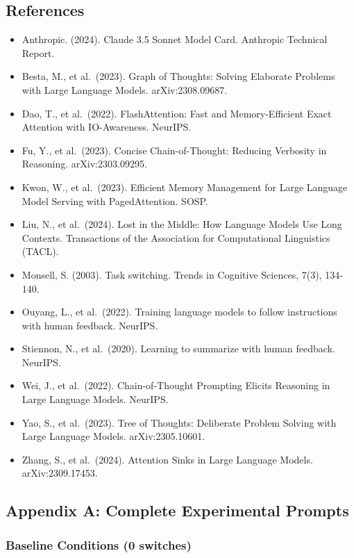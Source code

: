 \documentclass[
  11pt]{article}
\providecommand{\tightlist}{%
  \setlength{\itemsep}{0pt}\setlength{\parskip}{0pt}}
\begin{document}
\subsection{References}\label{references}

\begin{itemize}
\tightlist
\item
  Anthropic. (2024). Claude 3.5 Sonnet Model Card. Anthropic Technical
  Report.
\item
  Besta, M., et al.~(2023). Graph of Thoughts: Solving Elaborate
  Problems with Large Language Models. arXiv:2308.09687.
\item
  Dao, T., et al.~(2022). FlashAttention: Fast and Memory-Efficient
  Exact Attention with IO-Awareness. NeurIPS.
\item
  Fu, Y., et al.~(2023). Concise Chain-of-Thought: Reducing Verbosity in
  Reasoning. arXiv:2303.09295.
\item
  Kwon, W., et al.~(2023). Efficient Memory Management for Large
  Language Model Serving with PagedAttention. SOSP.
\item
  Liu, N., et al.~(2024). Lost in the Middle: How Language Models Use
  Long Contexts. Transactions of the Association for Computational
  Linguistics (TACL).
\item
  Monsell, S. (2003). Task switching. Trends in Cognitive Sciences,
  7(3), 134-140.
\item
  Ouyang, L., et al.~(2022). Training language models to follow
  instructions with human feedback. NeurIPS.
\item
  Stiennon, N., et al.~(2020). Learning to summarize with human
  feedback. NeurIPS.
\item
  Wei, J., et al.~(2022). Chain-of-Thought Prompting Elicits Reasoning
  in Large Language Models. NeurIPS.
\item
  Yao, S., et al.~(2023). Tree of Thoughts: Deliberate Problem Solving
  with Large Language Models. arXiv:2305.10601.
\item
  Zhang, S., et al.~(2024). Attention Sinks in Large Language Models.
  arXiv:2309.17453.
\end{itemize}

\subsection{Appendix A: Complete Experimental
Prompts}\label{appendix-a-complete-experimental-prompts}

\subsubsection{Baseline Conditions (0
switches)}\label{baseline-conditions-0-switches}
\end{document}
